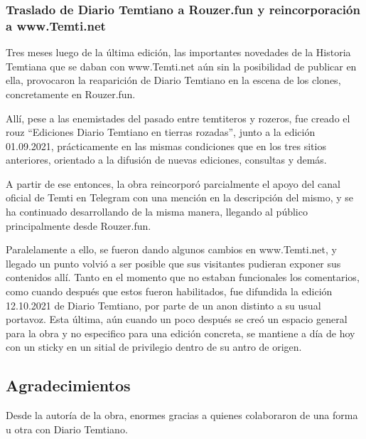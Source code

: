 \documentclass[
  spanish,
]{book}
\begin{document}
\hypertarget{traslado-de-diario-temtiano-a-rouzer.fun-y-reincorporaciuxf3n-a-www.temti.net}{%
\subsubsection*{Traslado de Diario Temtiano a Rouzer.fun y reincorporación a www.Temti.net}\label{traslado-de-diario-temtiano-a-rouzer.fun-y-reincorporaciuxf3n-a-www.temti.net}}

Tres meses luego de la última edición, las importantes novedades de la Historia Temtiana que se daban con www.Temti.net aún sin la posibilidad de publicar en ella, provocaron la reaparición de Diario Temtiano en la escena de los clones, concretamente en Rouzer.fun.

Allí, pese a las enemistades del pasado entre temtiteros y rozeros, fue creado el rouz ``Ediciones Diario Temtiano en tierras rozadas'', junto a la edición 01.09.2021, prácticamente en las mismas condiciones que en los tres sitios anteriores, orientado a la difusión de nuevas ediciones, consultas y demás.

A partir de ese entonces, la obra reincorporó parcialmente el apoyo del canal oficial de Temti en Telegram con una mención en la descripción del mismo, y se ha continuado desarrollando de la misma manera, llegando al público principalmente desde Rouzer.fun.

Paralelamente a ello, se fueron dando algunos cambios en www.Temti.net, y llegado un punto volvió a ser posible que sus visitantes pudieran exponer sus contenidos allí. Tanto en el momento que no estaban funcionales los comentarios, como cuando después que estos fueron habilitados, fue difundida la edición 12.10.2021 de Diario Temtiano, por parte de un anon distinto a su usual portavoz. Esta última, aún cuando un poco después se creó un espacio general para la obra y no especifico para una edición concreta, se mantiene a día de hoy con un sticky en un sitial de privilegio dentro de su antro de origen.

\hypertarget{agradecimientos}{%
\subsection*{Agradecimientos}\label{agradecimientos}}

Desde la autoría de la obra, enormes gracias a quienes colaboraron de una forma u otra con Diario Temtiano.
\end{document}
